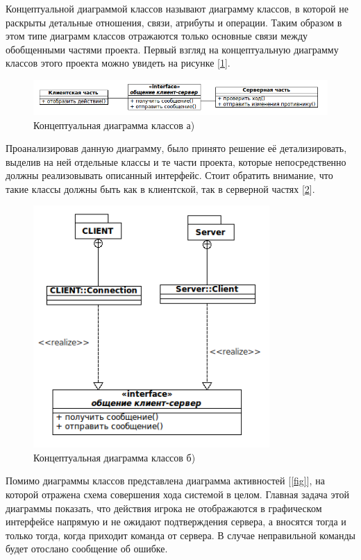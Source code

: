 Концептуальной диаграммой классов называют диаграмму классов, в которой не раскрыты детальные отношения, связи, атрибуты и операции. Таким образом в этом типе диаграмм классов отражаются только основные связи между обобщенными частями проекта. Первый взгляд на концептуальную диаграмму классов этого проекта можно увидеть на рисунке [\ref{fig1}].

\begin{figure}[ht]
\centering
\includegraphics[width=17cm]{images/class.png}
\caption{Концептуальная диаграмма классов а)}
\label{fig1}
\end{figure}

Проанализировав данную диаграмму, было принято решение её детализировать, выделив на ней отдельные классы и те части проекта, которые непосредственно должны реализовывать описанный интерфейс. Стоит обратить внимание, что такие классы должны быть как в клиентской, так в серверной частях [\ref{fig2}].

\begin{figure}[ht]
\centering
\includegraphics[width=9cm]{images/class1.png}
\caption{Концептуальная диаграмма классов б)}
\label{fig2}
\end{figure}

Помимо диаграммы классов представлена диаграмма активностей [\ref{fig}], на которой отражена схема совершения хода системой в целом. Главная задача этой диаграммы показать, что действия игрока не отображаются в графическом интерфейсе напрямую и не ожидают подтверждения сервера, а вносятся тогда и только тогда, когда приходит команда от сервера. В случае неправильной команды будет отослано сообщение об ошибке. 

